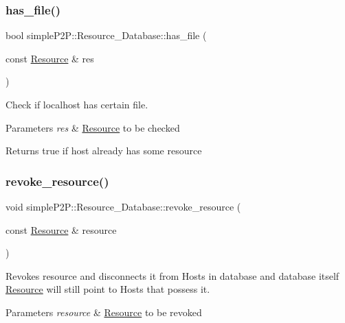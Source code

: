 \subsubsection{\texorpdfstring{has\+\_\+file()}{has\_file()}}
{\footnotesize\ttfamily bool simple\+P2\+P\+::\+Resource\+\_\+\+Database\+::has\+\_\+file (\begin{DoxyParamCaption}\item[{const \hyperlink{classsimpleP2P_1_1Resource}{Resource} \&}]{res }\end{DoxyParamCaption})}



Check if localhost has certain file. 


\begin{DoxyParams}{Parameters}
{\em res} & \hyperlink{classsimpleP2P_1_1Resource}{Resource} to be checked \\
\hline
\end{DoxyParams}
\begin{DoxyReturn}{Returns}
true if host already has some resource 
\end{DoxyReturn}
\mbox{\label{classsimpleP2P_1_1Resource__Database_a7ea91d496814c3d911b14ef4cd863943}} 
\subsubsection{\texorpdfstring{revoke\+\_\+resource()}{revoke\_resource()}}
{\footnotesize\ttfamily void simple\+P2\+P\+::\+Resource\+\_\+\+Database\+::revoke\+\_\+resource (\begin{DoxyParamCaption}\item[{const \hyperlink{classsimpleP2P_1_1Resource}{Resource} \&}]{resource }\end{DoxyParamCaption})}



Revokes resource and disconnects it from Hosts in database and database itself \hyperlink{classsimpleP2P_1_1Resource}{Resource} will still point to Hosts that possess it. 


\begin{DoxyParams}{Parameters}
{\em resource} & \hyperlink{classsimpleP2P_1_1Resource}{Resource} to be revoked \\
\hline
\end{DoxyParams}
\mbox{\label{classsimpleP2P_1_1Resource__Database_a181e862da4be11acbdb7d5569ad6925a}} 
